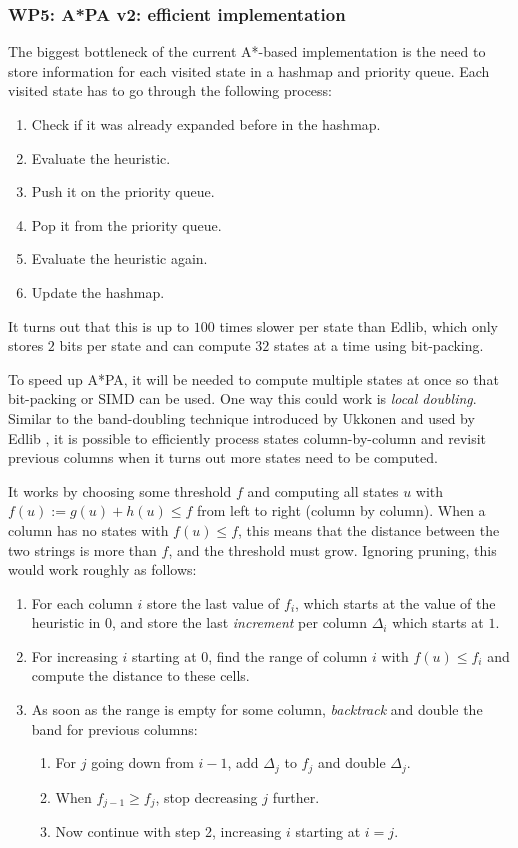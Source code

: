 \documentclass[11pt,english,a4paper]{article}
\begin{document}
\subsubsection{WP5: A*PA v2: efficient implementation}
\label{sec:org819e8ca}
The biggest bottleneck of the current A*-based implementation is the need to
store information for each visited state in a hashmap and priority queue.
Each visited state has to go through the following process:
\begin{enumerate}
\item Check if it was already expanded before in the hashmap.
\item Evaluate the heuristic.
\item Push it on the priority queue.
\item Pop it from the priority queue.
\item Evaluate the heuristic again.
\item Update the hashmap.
\end{enumerate}

It turns out that this is up to \(100\) times slower per state than Edlib, which
only stores \(2\) bits per state and can compute \(32\) states at a time using
bit-packing.

To speed up A*PA, it will be needed to compute multiple states at once so that
bit-packing or SIMD can be used.
One way this could work is \emph{local doubling}.
Similar to the band-doubling technique introduced by Ukkonen and used by Edlib
\autocite{ukkonen85,edlib}, it is possible to efficiently process states
column-by-column and revisit previous columns when it turns out more states need
to be computed.

It works by choosing some threshold \(f\) and computing all states \(u\) with \(f(u)
:= g(u) + h(u) \leq f\) from left to right (column by column). When a column has
no states with \(f(u) \leq f\), this means that the distance between the two
strings is more than \(f\), and the threshold must grow. Ignoring pruning, this would
work roughly as follows:
\begin{enumerate}
\item For each column \(i\) store the last value of \(f_i\), which starts at the value
of the heuristic in \(0\), and
store the last \emph{increment} per column \(\Delta_i\) which starts at \(1\).
\item For increasing \(i\) starting at \(0\), find the range of
column \(i\) with \(f(u) \leq f_i\) and compute the distance to these cells.
\item As soon as the range is empty for some column, \emph{backtrack} and double the band for
previous columns:
\begin{enumerate}
\item For \(j\) going down from \(i-1\), add \(\Delta_{j}\) to \(f_{j}\) and double \(\Delta_{j}\).
\item When \(f_{j-1} \geq f_{j}\), stop decreasing \(j\) further.
\item Now continue with step 2, increasing \(i\) starting at \(i=j\).
\end{enumerate}
\end{enumerate}
\end{document}

